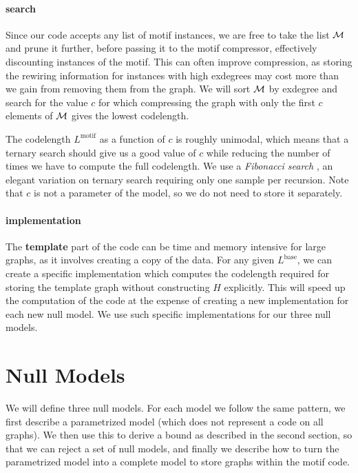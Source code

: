 \paragraph{search} Since our code accepts any list of motif instances, we are free to take the list $\cal M$ and prune it further, before passing it to the motif compressor, effectively discounting instances of the motif. This can often improve compression, as storing the rewiring information for instances with high exdegrees may cost more than we gain from removing them from the graph. We will sort  $\cal M$ by exdegree and search for the value $c$ for which compressing the graph with only the first $c$ elements of $\cal M$ gives the lowest codelength.

The codelength $L^\text{motif}$ as a function of $c$ is roughly unimodal, which means that a ternary search should give us a good value of $c$ while reducing the number of times we have to compute the full codelength. We use a \emph{Fibonacci search} \cite{kiefer1953sequential}, an elegant variation on ternary search requiring only one sample per recursion. Note that $c$ is not a parameter of the model, so we do not need to store it separately.  

\paragraph{implementation} The \textbf{template} part of the code can be time and memory intensive for large graphs, as it involves creating a copy of the data. For any given $L^\text{base}$, we can create a specific implementation which computes the codelength required for storing the template graph without constructing $H$ explicitly. This will speed up the computation of the code at the expense of creating a new implementation for each new null model. We use such specific implementations for our three null models.

\section*{Null Models}

We will define three null models. For each model we follow the same pattern, we first describe a parametrized model (which does not represent a code on all graphs). We then use this to derive a bound as described in the second section, so that we can reject a set of null models, and finally we describe how to turn the parametrized model into a complete model to store graphs within the motif code.  

